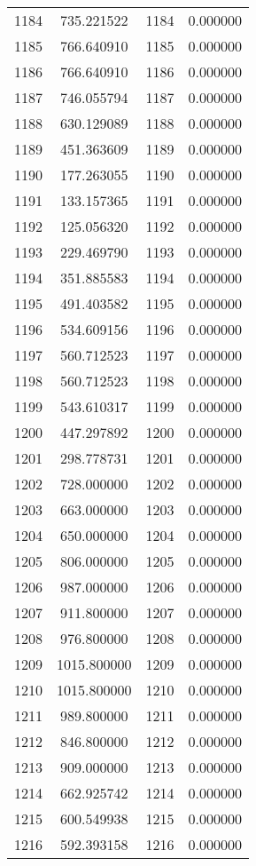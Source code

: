 \documentclass[12pt]{article}
\begin{document}
\begin{longtable}{@{}cccc@{}}
1184 & 735.221522 & 1184 & 0.000000 \\
1185 & 766.640910 & 1185 & 0.000000 \\
1186 & 766.640910 & 1186 & 0.000000 \\
1187 & 746.055794 & 1187 & 0.000000 \\
1188 & 630.129089 & 1188 & 0.000000 \\
1189 & 451.363609 & 1189 & 0.000000 \\
1190 & 177.263055 & 1190 & 0.000000 \\
1191 & 133.157365 & 1191 & 0.000000 \\
1192 & 125.056320 & 1192 & 0.000000 \\
1193 & 229.469790 & 1193 & 0.000000 \\
1194 & 351.885583 & 1194 & 0.000000 \\
1195 & 491.403582 & 1195 & 0.000000 \\
1196 & 534.609156 & 1196 & 0.000000 \\
1197 & 560.712523 & 1197 & 0.000000 \\
1198 & 560.712523 & 1198 & 0.000000 \\
1199 & 543.610317 & 1199 & 0.000000 \\
1200 & 447.297892 & 1200 & 0.000000 \\
1201 & 298.778731 & 1201 & 0.000000 \\
1202 & 728.000000 & 1202 & 0.000000 \\
1203 & 663.000000 & 1203 & 0.000000 \\
1204 & 650.000000 & 1204 & 0.000000 \\
1205 & 806.000000 & 1205 & 0.000000 \\
1206 & 987.000000 & 1206 & 0.000000 \\
1207 & 911.800000 & 1207 & 0.000000 \\
1208 & 976.800000 & 1208 & 0.000000 \\
1209 & 1015.800000 & 1209 & 0.000000 \\
1210 & 1015.800000 & 1210 & 0.000000 \\
1211 & 989.800000 & 1211 & 0.000000 \\
1212 & 846.800000 & 1212 & 0.000000 \\
1213 & 909.000000 & 1213 & 0.000000 \\
1214 & 662.925742 & 1214 & 0.000000 \\
1215 & 600.549938 & 1215 & 0.000000 \\
1216 & 592.393158 & 1216 & 0.000000 \\

\end{longtable}
\end{document}
